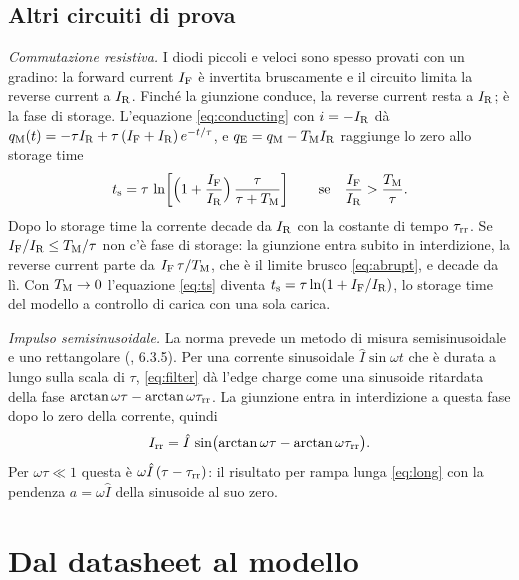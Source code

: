 \documentclass[10pt,a4paper]{scrartcl}
\let\newcommand\lmitdefine
\newcommand{\IF}{I_\mathrm{F}}
\newcommand{\IR}{I_\mathrm{R}}
\newcommand{\Irr}{I_\mathrm{rr}}
\newcommand{\ts}{t_\mathrm{s}}
\newcommand{\taurr}{\tau_\mathrm{rr}}
\newcommand{\TM}{T_\mathrm{M}}
\newcommand{\qE}{q_\mathrm{E}}
\newcommand{\qM}{q_\mathrm{M}}
\begin{document}
\subsection{Altri circuiti di prova}
\label{sec:othertests}
\emph{Commutazione resistiva.} I diodi piccoli e veloci sono spesso provati con un gradino: la forward current $\IF$ è invertita bruscamente e il circuito limita la reverse current a $\IR$. Finché la giunzione conduce, la reverse current resta a $\IR$; è la fase di storage. L'equazione \eqref{eq:conducting} con $i = -\IR$ dà $\qM(t) = -\tau\IR + \tau\,(\IF+\IR)\,e^{-t/\tau}$, e $\qE = \qM - \TM\IR$ raggiunge lo zero allo storage time
\begin{equation}
\ts = \tau\,\ln\!\left[\Bigl(1+\frac{\IF}{\IR}\Bigr)\,\frac{\tau}{\tau+\TM}\right] \qquad \text{se} \quad \frac{\IF}{\IR} > \frac{\TM}{\tau} .
\label{eq:ts}
\end{equation}
Dopo lo storage time la corrente decade da $\IR$ con la costante di tempo $\taurr$. Se $\IF/\IR \leq \TM/\tau$ non c'è fase di storage: la giunzione entra subito in interdizione, la reverse current parte da $\IF\,\tau/\TM$, che è il limite brusco \eqref{eq:abrupt}, e decade da lì. Con $\TM \to 0$ l'equazione \eqref{eq:ts} diventa $\ts = \tau\ln(1+\IF/\IR)$, lo storage time del modello a controllo di carica con una sola carica.

\emph{Impulso semisinusoidale.} La norma prevede un metodo di misura semisinusoidale e uno rettangolare (\cite{iec60747}, 6.3.5). Per una corrente sinusoidale $\hat I\sin\omega t$ che è durata a lungo sulla scala di $\tau$, \eqref{eq:filter} dà l'edge charge come una sinusoide ritardata della fase $\arctan\omega\tau - \arctan\omega\taurr$. La giunzione entra in interdizione a questa fase dopo lo zero della corrente, quindi
\begin{equation}
\Irr = \hat I\,\sin\bigl(\arctan\omega\tau - \arctan\omega\taurr\bigr) .
\label{eq:sine}
\end{equation}
Per $\omega\tau \ll 1$ questa è $\omega\hat I\,(\tau-\taurr)$: il risultato per rampa lunga \eqref{eq:long} con la pendenza $a = \omega\hat I$ della sinusoide al suo zero.

\section{Dal datasheet al modello}
\label{sec:inverse}
\end{document}
